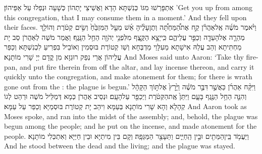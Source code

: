 {אִתְפָּרַשׁוּ מִגּוֹ כְּנִשְׁתָּא הָדָא וַאֲשֵׁיצֵי יָתְהוֹן כְּשָׁעָה וּנְפַלוּ עַל אַפֵּיהוֹן׃}
{’Get you up from among this congregation, that I may consume them in a moment.’ And they fell upon their faces.}{}
{וַיֹּ֨אמֶר מֹשֶׁ֜ה אֶֽל\maqqaf אַהֲרֹ֗ן קַ֣ח אֶת\maqqaf הַ֠מַּחְתָּ֠ה וְתֶן\maqqaf עָלֶ֨יהָ אֵ֜שׁ מֵעַ֤ל הַמִּזְבֵּ֙חַ֙ וְשִׂ֣ים קְטֹ֔רֶת וְהוֹלֵ֧ךְ מְהֵרָ֛ה אֶל\maqqaf הָעֵדָ֖ה וְכַפֵּ֣ר עֲלֵיהֶ֑ם כִּֽי\maqqaf יָצָ֥א הַקֶּ֛צֶף מִלִּפְנֵ֥י יְהֹוָ֖ה הֵחֵ֥ל הַנָּֽגֶף׃}
{וַאֲמַר מֹשֶׁה לְאַהֲרֹן סַב יָת מַחְתִּיתָא וְהַב עֲלַהּ אִישָׁתָא מֵעִלָּוֵי מַדְבְּחָא וְשַׁו קְטוֹרֶת בּוּסְמִין וְאוֹבֵיל בִּפְרִיעַ לִכְנִשְׁתָּא וְכַפַּר עֲלֵיהוֹן אֲרֵי נְפַק רוּגְזָא מִן קֳדָם יְיָ שָׁרִי מוֹתָנָא׃}
{And Moses said unto Aaron: ‘Take thy fire-pan, and put fire therein from off the altar, and lay incense thereon, and carry it quickly unto the congregation, and make atonement for them; for there is wrath gone out from the \lord: the plague is begun.’}{}
{וַיִּקַּ֨ח אַהֲרֹ֜ן כַּאֲשֶׁ֣ר \legarmeh  דִּבֶּ֣ר מֹשֶׁ֗ה וַיָּ֙רׇץ֙ אֶל\maqqaf תּ֣וֹךְ הַקָּהָ֔ל וְהִנֵּ֛ה הֵחֵ֥ל הַנֶּ֖גֶף בָּעָ֑ם וַיִּתֵּן֙ אֶֽת\maqqaf הַקְּטֹ֔רֶת וַיְכַפֵּ֖ר עַל\maqqaf הָעָֽם׃}
{וּנְסֵיב אַהֲרֹן כְּמָא דְּמַלֵּיל מֹשֶׁה וּרְהַט לְגוֹ קְהָלָא וְהָא שָׁרִי מוֹתָנָא בְּעַמָּא וִיהַב יָת קְטוֹרֶת בּוּסְמַיָּא וְכַפַּר עַל עַמָּא׃}
{And Aaron took as Moses spoke, and ran into the midst of the assembly; and, behold, the plague was begun among the people; and he put on the incense, and made atonement for the people.}{}
{וַיַּעֲמֹ֥ד בֵּֽין\maqqaf הַמֵּתִ֖ים וּבֵ֣ין הַֽחַיִּ֑ים וַתֵּעָצַ֖ר הַמַּגֵּפָֽה׃}
{וְקָם בֵּין מִיתַיָּא וּבֵין חַיַּיָּא וְאִתְכְּלִי מוֹתָנָא׃}
{And he stood between the dead and the living; and the plague was stayed.}{}
